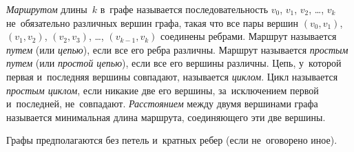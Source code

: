


\emph{Маршрутом} длины~$k$ в~графе называется последовательность
$v_{0}$, $v_{1}$, $v_{2}$, \ldots, $v_{k}$ не~обязательно различных вершин
графа, такая что все пары вершин
$(v_{0}, v_{1})$, $(v_{1}, v_{2})$, $(v_{2}, v_{3})$, \ldots,
$(v_{k-1}, v_{k})$ соединены ребрами.
Маршрут называется \emph{путем} (или \emph{цепью}), если все его ребра
различны.
Маршрут называется \emph{простым путем} (или \emph{простой цепью}), если все
его вершины различны.
Цепь, у~которой первая и~последняя вершины совпадают, называется \emph{циклом}.
Цикл называется \emph{простым циклом}, если никакие две его вершины,
за~исключением первой и~последней, не~совпадают.
\emph{Расстоянием} между двумя вершинами графа называется минимальная длина
маршрута, соединяющего эти две вершины.

Графы предполагаются без петель и~кратных ребер (если не~оговорено иное).

